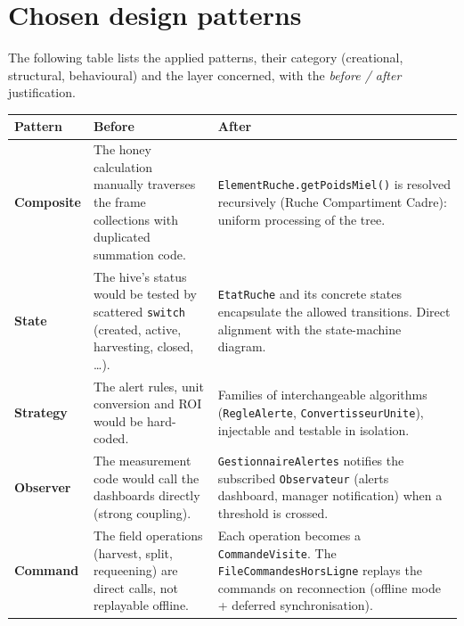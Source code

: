 \section{Chosen design patterns}
The following table lists the applied patterns, their category (creational,
structural, behavioural) and the layer concerned, with the \emph{before / after}
justification.

\begin{xltabular}{\textwidth}{>{\bfseries}p{2.7cm} p{5.9cm} X}
\toprule
\textbf{Pattern} & \textbf{Before} & \textbf{After} \\
\midrule
\endhead
Composite  &
The honey calculation manually traverses the frame collections with duplicated
summation code. &
\texttt{ElementRuche.getPoidsMiel()} is resolved recursively
(Ruche \textrightarrow{} Compartiment \textrightarrow{} Cadre): uniform
processing of the tree. \\
State  &
The hive's status would be tested by scattered \texttt{switch} (created, active,
harvesting, closed, \ldots). &
\texttt{EtatRuche} and its concrete states encapsulate the allowed transitions.
Direct alignment with the state-machine diagram. \\
Strategy  &
The alert rules, unit conversion and ROI would be hard-coded. &
Families of interchangeable algorithms (\texttt{RegleAlerte},
\texttt{ConvertisseurUnite}), injectable and testable in isolation. \\
Observer  &
The measurement code would call the dashboards directly (strong coupling). &
\texttt{GestionnaireAlertes} notifies the subscribed \texttt{Observateur}
(alerts dashboard, manager notification) when a threshold is crossed. \\
Command  &
The field operations (harvest, split, requeening) are direct calls, not
replayable offline. &
Each operation becomes a \texttt{CommandeVisite}. The
\texttt{FileCommandesHorsLigne} replays the commands on reconnection
(offline mode + deferred synchronisation). \\

\end{xltabular}
